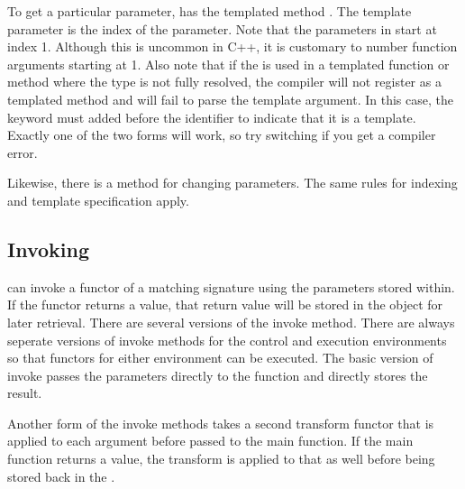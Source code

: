 To get a particular parameter,  has the
templated method . The template parameter is the
index of the parameter. Note that the parameters in
 start at index 1. Although this is
uncommon in C++, it is customary to number function arguments starting at
1. Also note that if the  is used in a
templated function or method where the type is not fully resolved, the
compiler will not register  as a templated method
and will fail to parse the template argument. In this case, the
 keyword must added before the 
identifier to indicate that it is a template. Exactly one of the two forms
will work, so try switching if you get a compiler error.


Likewise, there is a  method for changing parameters.
The same rules for indexing and template specification apply.


\subsection{Invoking}


 can invoke a functor of a matching
signature using the parameters stored within. If the functor returns a
value, that return value will be stored in the
 object for later retrieval. There are
several versions of the invoke method. There are always seperate versions
of invoke methods for the control and execution environments so that
functors for either environment can be executed. The basic version of
invoke passes the parameters directly to the function and directly stores
the result.


Another form of the invoke methods takes a second transform functor that is
applied to each argument before passed to the main function. If the main
function returns a value, the transform is applied to that as well before
being stored back in the .

